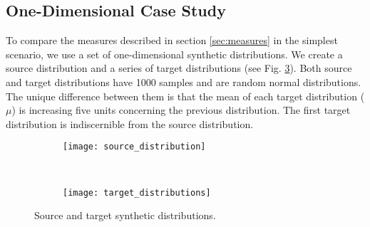 \subsection{One-Dimensional Case Study}\label{subsec:1d_case}
To compare the measures described in section \ref{sec:measures} in the simplest scenario, we use a set of one-dimensional synthetic distributions. We create a source distribution and a series of target distributions (see Fig. \ref{fig:source_target_dist}). Both source and target distributions have 1000 samples and are random normal distributions. The unique difference between them is that the mean of each target distribution ($\mu$) is increasing five units concerning the previous distribution. The first target distribution is indiscernible from the source distribution.

\begin{figure}[ht] 
	\centering
	\begin{subfigure}[b]{0.45\textwidth}
		\centering
		\texttt{[image: source\_distribution]}	
		\label{fig:source_distribution}
	\end{subfigure}
	~ %
	\begin{subfigure}[b]{0.45\textwidth}
		\centering
		\texttt{[image: target\_distributions]}	
		\label{fig:targert_distributions}
	\end{subfigure}

  \caption{Source and target synthetic distributions.}
  \label{fig:source_target_dist}
\end{figure}



